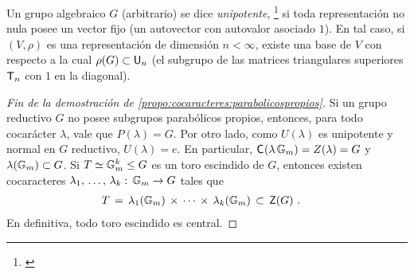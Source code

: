 Un grupo algebraico $G$ (arbitrario) se dice \emph{unipotente},%
\footnote{
	\cite[\S~6.45]{MilneAlgebraicGroups}
}
si toda representaci\'{o}n no nula posee un vector fijo (un autovector con
autovalor asociado $1$). En tal caso, si $(V,\rho)$ es una representaci\'{o}n
de dimensi\'{o}n $n<\infty$, existe una base de $V$ con respecto a la cual
$\rho(G)\subset\unipotentes[n]$ (el subgrupo de las matrices triangulares
superiores $\triangulares[n]$ con $1$ en la diagonal).

\begin{proof}[Fin de la demostraci\'{o}n de %
	\ref{propo:cocaracteres:parabolicospropios}]
	Si un grupo reductivo $G$ no posee subgrupos parab\'{o}licos propios,
	entonces, para todo cocar\'{a}cter $\lambda$, vale que $P(\lambda)=G$.
	Por otro lado, como $U(\lambda)$ es unipotente y normal en $G$
	reductivo, $U(\lambda)=e$. En particular,
	$\centraliza(\lambda\,\multiplicativo)=Z(\lambda)=G$ y
	$\lambda(\multiplicativo)\subset G$. Si
	$T\simeq\multiplicativo^k\leq G$ es un toro escindido de $G$, entonces
	existen cocaracteres
	$\lista{\lambda}{k}:\,\multiplicativo\rightarrow G$ tales que
	\begin{align*}
		T & \,=\,\lambda_1(\multiplicativo)\,\times\,\cdots\,\times\,
			\lambda_k(\multiplicativo) \,\subset\,\centre(G)
		\text{ .}
	\end{align*}
	En definitiva, todo toro escindido es central.
\end{proof}
